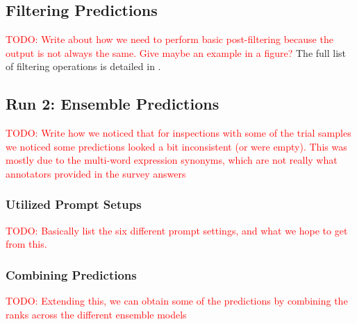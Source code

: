 \documentclass[11pt]{article}
\newcommand{\todo}[1]{\textcolor{red}{TODO: #1}}
\begin{document}
\subsection{Filtering Predictions}
\todo{Write about how we need to perform basic post-filtering because the output is not always the same. Give maybe an example in a figure?}
The full list of filtering operations is detailed in .

\subsection{Run 2: Ensemble Predictions}
\todo{Write how we noticed that for inspections with some of the trial samples we noticed some predictions looked a bit inconsistent (or were empty). This was mostly due to the multi-word expression synonyms, which are not really what annotators provided in the survey answers}

\subsubsection{Utilized Prompt Setups}

\todo{Basically list the six different prompt settings, and what we hope to get from this.}

\subsubsection{Combining Predictions}
\todo{Extending this, we can obtain some of the predictions by combining the ranks across the different ensemble models}
\end{document}
